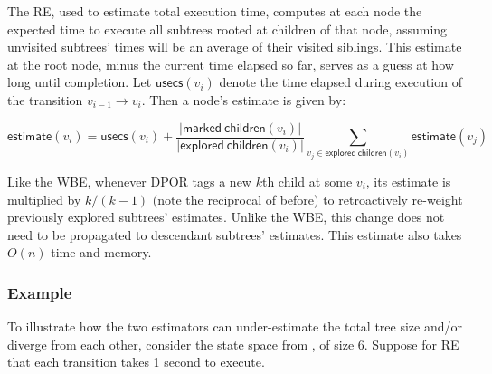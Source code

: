 The RE, used to estimate total execution time,
computes at each node the expected time to execute all subtrees rooted at children of that node,
assuming unvisited subtrees' times will be an average of their visited siblings.
This estimate at the root node, minus the current time elapsed so far,
serves as a guess at how long until completion.
Let $\mathsf{usecs}(v_i)$ denote the time elapsed during execution of the transition $v_{i-1} \rightarrow v_i$.
Then a node's estimate is given by:

\[
	\mathsf{estimate}(v_i) = \mathsf{usecs}(v_i) +
	\frac{|\mathsf{marked~children}(v_i)|}{|\mathsf{explored~children}(v_i)|}
	\sum_{v_j \in \mathsf{explored~children}(v_i)} \mathsf{estimate}(v_j)
\]

Like the WBE, whenever DPOR tags a new $k$th child at some $v_i$,
its estimate is multiplied by $k/(k-1)$ (note the reciprocal of before)
to retroactively re-weight previously explored subtrees' estimates.
Unlike the WBE, this change does not need to be propagated to descendant subtrees' estimates.
This estimate also takes $O(n)$ time and memory.

\subsubsection{Example}

To illustrate how the two estimators can under-estimate the total tree size and/or diverge from each other,
consider the state space from , of size 6.
Suppose for RE that each transition takes 1 second to execute.

